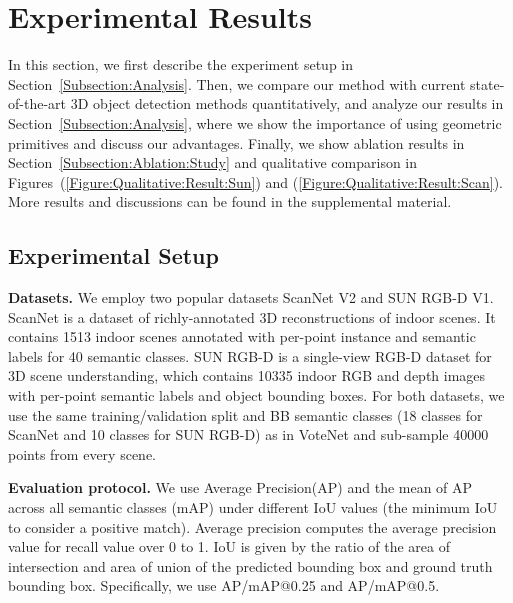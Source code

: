 \section{Experimental Results}
\label{Section:Results}

In this section, we first describe the experiment setup in Section~\ref{Subsection:Analysis}. Then, we compare our method with current state-of-the-art 3D object detection methods quantitatively, and analyze our results in Section~\ref{Subsection:Analysis}, where we show the importance of using geometric primitives and discuss our advantages. Finally, we show ablation results in Section~\ref{Subsection:Ablation:Study} and qualitative comparison in Figures~(\ref{Figure:Qualitative:Result:Sun}) and (\ref{Figure:Qualitative:Result:Scan}). More results and discussions can be found in the supplemental material.

\subsection{Experimental Setup}
\label{Subsection:Setup}

\noindent\textbf{Datasets.} We employ two popular datasets ScanNet V2\cite{Dai_2017_CVPR_scannet} and SUN RGB-D V1\cite{song2015sun}. 
ScanNet is a dataset of richly-annotated 3D reconstructions of indoor scenes. It contains 1513 indoor scenes annotated with per-point instance and semantic labels for 40 semantic classes. SUN RGB-D is a single-view RGB-D dataset for 3D scene understanding, which contains 10335 indoor RGB and depth images with per-point semantic labels and object bounding boxes. For both datasets, we use the same training/validation split and BB semantic classes (18 classes for ScanNet and 10 classes for SUN RGB-D) as in VoteNet\cite{qi2019votenet} and sub-sample 40000 points from every scene. 

\noindent\textbf{Evaluation protocol.} We use Average Precision(AP) and the mean of AP across all semantic classes (mAP)\cite{song2015sun}  under different IoU values (the minimum IoU to consider a positive match). Average precision computes the average precision value for recall value over 0 to 1. IoU is given by the ratio of the area of intersection and area of union of the predicted bounding box and ground truth bounding box. Specifically, we use AP/mAP@0.25 and AP/mAP@0.5. 



